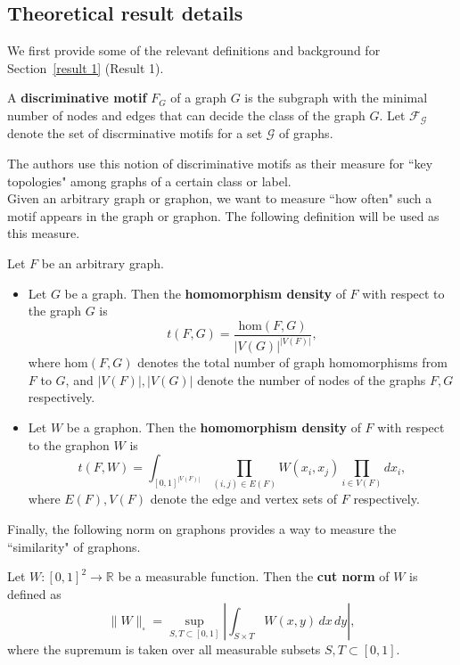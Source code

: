 \subsection{Theoretical result details}\label{appendix: theory}

We first provide some of the relevant definitions and background for Section~\ref{result 1} (Result 1).

\begin{definition}
A \textbf{discriminative motif} $F_G$ of a graph $G$ is the subgraph with the minimal number of nodes and edges that can decide the class of the graph $G$. Let $\mathcal{F}_{\mathcal{G}}$ denote the set of discrminative motifs for a set $\mathcal{G}$ of graphs.
\end{definition}

The authors use this notion of discriminative motifs as their measure for ``key topologies" among graphs of a certain class or label. 
\\

Given an arbitrary graph or graphon, we want to measure ``how often" such a motif appears in the graph or graphon. The following definition will be used as this measure.

\begin{definition}
Let $F$ be an arbitrary graph. 
\begin{itemize}
    \item Let $G$ be a graph. Then the \textbf{homomorphism density} of $F$ with respect to the graph $G$ is
    \[t(F,G)=\frac{\text{hom}(F,G)}{|V(G)|^{|V(F)|}},\]
    where $\text{hom}(F,G)$ denotes the total number of graph homomorphisms from $F$ to $G$, and $|V(F)|,|V(G)|$ denote the number of nodes of the graphs $F,G$ respectively.
    \item Let $W$ be a graphon. Then the \textbf{homomorphism density} of $F$ with respect to the graphon $W$ is
    \[t(F,W)=\int_{[0,1]^{|V(F)|}}\prod_{(i,j)\in E(F)}W(x_i,x_j)\prod_{i\in V(F)}dx_i,\]
    where $E(F),V(F)$ denote the edge and vertex sets of $F$ respectively.
\end{itemize}
\end{definition}

Finally, the following norm on graphons provides a way to measure the ``similarity" of graphons.

\begin{definition}
Let $W:[0,1]^2\to\mathbb{R}$ be a measurable function. Then the \textbf{cut norm} of $W$ is defined as
\[\lVert W\rVert_{\square}=\sup_{S,T\subset[0,1]}\left|\int_{S\times T}W(x,y)\,dx\,dy\right|,\]
where the supremum is taken over all measurable subsets $S,T\subset [0,1]$.
\end{definition}

